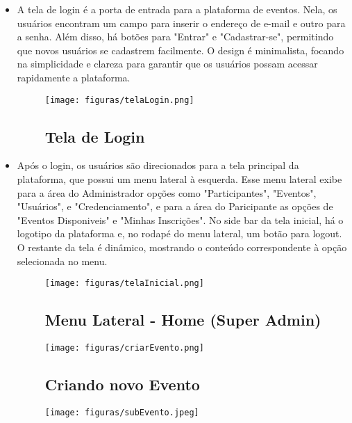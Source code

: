 \begin{itemize}
\begin{itemize}

 \item A tela de login é a porta de entrada para a plataforma de eventos. Nela, os usuários encontram um campo para inserir o endereço de e-mail e outro para a senha. Além disso, há botões para "Entrar" e "Cadastrar-se", permitindo que novos usuários se cadastrem facilmente. O design é minimalista, focando na simplicidade e clareza para garantir que os usuários possam acessar rapidamente a plataforma.

 \begin{figure}[h!]
    \centering
    \texttt{[image: figuras/telaLogin.png]}
    \subsection{{Tela de Login}}
    \label{fig:telaLogin}
\end{figure}

 \item Após o login, os usuários são direcionados para a tela principal da plataforma, que possui um menu lateral à esquerda. Esse menu lateral exibe para a área do Administrador opções como "Participantes", "Eventos", "Usuários", e "Credenciamento", e para a área do Paricipante as opções de "Eventos Disponiveis" e "Minhas Inscrições". No side bar da tela inicial, há o logotipo da plataforma e, no rodapé do menu lateral, um botão para logout. O restante da tela é dinâmico, mostrando o conteúdo correspondente à opção selecionada no menu.

\begin{figure}[h!]
    \centering
    \texttt{[image: figuras/telaInicial.png]}
    \subsection{{Menu Lateral - Home (Super Admin)}}
    \label{fig:telaInicial}
\end{figure}

\begin{figure}[h!]
    \centering
    \texttt{[image: figuras/criarEvento.png]}
    \subsection{{Criando novo Evento}}
    \label{fig:criarEvento}
\end{figure}

\begin{figure}[h!]
    \centering
    \texttt{[image: figuras/subEvento.jpeg]}

\end{figure}
\end{itemize}
\end{itemize}

